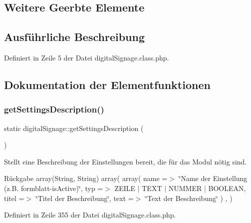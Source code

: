 \subsection*{Weitere Geerbte Elemente}


\subsection{Ausführliche Beschreibung}


Definiert in Zeile 5 der Datei digital\+Signage.\+class.\+php.



\subsection{Dokumentation der Elementfunktionen}
\mbox{\label{classdigital_signage_a91f959778d7f6313642bcc1511c58dde}} 
\subsubsection{\texorpdfstring{get\+Settings\+Description()}{getSettingsDescription()}}
{\footnotesize\ttfamily static digital\+Signage\+::get\+Settings\+Description (\begin{DoxyParamCaption}{ }\end{DoxyParamCaption})\hspace{0.3cm}{\ttfamily [static]}}

Stellt eine Beschreibung der Einstellungen bereit, die für das Modul nötig sind. \begin{DoxyReturn}{Rückgabe}
array(\+String, String) array( array( \textquotesingle{}name\textquotesingle{} =$>$ \char`\"{}\+Name der Einstellung (z.\+B. formblatt-\/is\+Active)\char`\"{}, \textquotesingle{}typ\textquotesingle{} =$>$ Z\+E\+I\+LE $\vert$ T\+E\+XT $\vert$ N\+U\+M\+M\+ER $\vert$ B\+O\+O\+L\+E\+AN, \textquotesingle{}titel\textquotesingle{} =$>$ \char`\"{}\+Titel der Beschreibung\char`\"{}, \textquotesingle{}text\textquotesingle{} =$>$ \char`\"{}\+Text der Beschreibung\char`\"{} ) , ) 
\end{DoxyReturn}


Definiert in Zeile 355 der Datei digital\+Signage.\+class.\+php.

\mbox{\label{classdigital_signage_a10f0fc6518175da2e3259b1a8db0c831}} 
